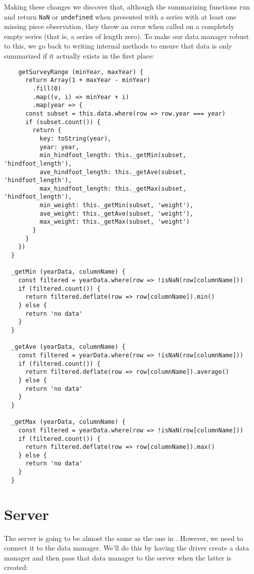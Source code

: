 Making these changes we discover that,
although the summarizing functions run and return
\texttt{NaN} or \texttt{undefined}
when presented with a series with at least one missing piece observation,
they throw an error when called on a completely empty series
(that is, a series of length zero).
To make our data manager robust to this,
we go back to writing internal methods
to ensure that data is only summarized
if it actually exists in the first place:

\begin{verbatim}
    getSurveyRange (minYear, maxYear) {
      return Array(1 + maxYear - minYear)
        .fill(0)
        .map((v, i) => minYear + i)
        .map(year => {
      const subset = this.data.where(row => row.year === year)
      if (subset.count()) {
        return {
          key: toString(year),
          year: year,
          min_hindfoot_length: this._getMin(subset, 'hindfoot_length'),
          ave_hindfoot_length: this._getAve(subset, 'hindfoot_length'),
          max_hindfoot_length: this._getMax(subset, 'hindfoot_length'),
          min_weight: this._getMin(subset, 'weight'),
          ave_weight: this._getAve(subset, 'weight'),
          max_weight: this._getMax(subset, 'weight')
        }
      }
    })
  }

  _getMin (yearData, columnName) {
    const filtered = yearData.where(row => !isNaN(row[columnName]))
    if (filtered.count()) {
      return filtered.deflate(row => row[columnName]).min()
    } else {
      return 'no data'
    }
  }

  _getAve (yearData, columnName) {
    const filtered = yearData.where(row => !isNaN(row[columnName]))
    if (filtered.count()) {
      return filtered.deflate(row => row[columnName]).average()
    } else {
      return 'no data'
    }
  }

  _getMax (yearData, columnName) {
    const filtered = yearData.where(row => !isNaN(row[columnName]))
    if (filtered.count()) {
      return filtered.deflate(row => row[columnName]).max()
    } else {
      return 'no data'
    }
  }
\end{verbatim}

\section{Server}\label{s:capstone-server}

The server is going to be almost the same as the one in .
However, we need to connect it to the data manager.
We'll do this by having the driver create a data manager
and then pass that data manager to the server when the latter is created:

